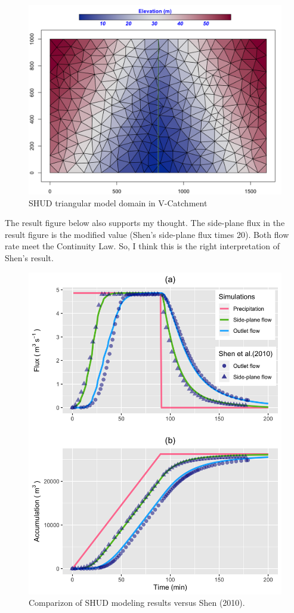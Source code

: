 \documentclass[
]{scrbook}
\begin{document}
\begin{figure}
\centering
\includegraphics{Fig/Example/vCat/vc_mesh.png}
\caption{SHUD triangular model domain in V-Catchment}
\end{figure}

The result figure below also supports my thought. The side-plane flux in the result figure is the modified value (Shen's side-plane flux times 20). Both flow rate meet the Continuity Law. So, I think this is the right interpretation of Shen's result.

\begin{figure}
\centering
\includegraphics{Fig/Example/vCat/vcat_vs_vs.png}
\caption{Comparizon of SHUD modeling results versus Shen (2010).}
\end{figure}
\end{document}
